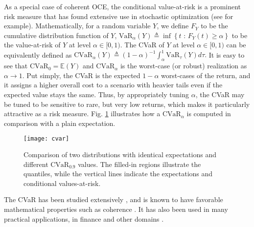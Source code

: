 \documentclass[12pt,technote,onecolumn]{IEEEtran}
\begin{document}
As a special case of coherent OCE, the conditional value-at-risk is a prominent risk measure that has found extensive use in stochastic optimization (see \cite{rockafellar2000optimization}
for example). Mathematically, for a random variable $Y$, we define
$F_{Y}$ to be the cumulative distribution function of $Y$, $\text{VaR}_{\alpha}\left(Y\right)\triangleq\inf\left\{ t\mbox{ : }F_{Y}\left(t\right)\geq\alpha\right\} $
to be the value-at-risk of $Y$ at level $\alpha\in[0,1)$. The CVaR of $Y$ at level $\alpha\in[0,1)$ can be equivalently defined as	$\text{CVaR}_{\alpha}(Y)\triangleq(1-\alpha)^{-1}\int_{\alpha}^{1}\text{VaR}_{\tau}(Y)d\tau.$
It is easy to see that $\text{CVaR}_{0}=\mathbb{E}(Y)$ and $\text{CVaR}_{\alpha}$ is the worst-case (or robust) realization as $\alpha\rightarrow1.$ Put simply, the CVaR is the expected $1-\alpha$ worst-cases of the return, and it assigns a higher overall cost to a scenario with heavier tails even if the expected value stays the same. Thus, by
appropriately tuning $\alpha$, the CVaR may be tuned to be sensitive to rare, but
very low returns, which makes it particularly attractive as a risk measure. Fig. \ref{fig:CVaR} illustrates how a $\text{CVaR}_{\alpha}$ is computed in comparison with a plain expectation. 
\begin{figure}[!tph]
	\begin{centering}
		\texttt{[image: cvar]}
		\par\end{centering}	
	\caption{Comparison of two distributions with identical expectations and different $\text{CVaR}_{0.9}$ values. The
		filled-in regions illustrate the quantiles, while the vertical lines indicate the expectations and conditional values-at-risk.
		\label{fig:CVaR}}
\end{figure}
The CVaR has been studied extensively \cite{rockafellar2000optimization,shapiro2014lectures}, and is known to have favorable mathematical properties such as coherence \cite{MAFI:MAFI068}. It has also been used in many practical applications, in finance and other domains \cite{uryasev2010var}.
\end{document}

